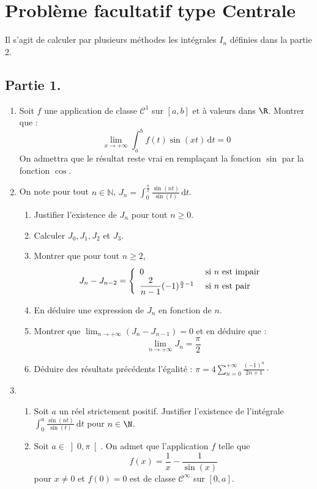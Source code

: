 \documentclass[a4paper,french,11pt,twoside]{VcCours}
\newcommand{\dt}{\text{d}t}
\begin{document}
\section*{Problème facultatif type Centrale}

Il s'agit de calculer par plusieurs méthodes les intégrales $I_n$ 
définies dans la partie 2.

\subsection*{Partie 1.}

 \begin{enumerate}
\item Soit $f$ une application de classe $\mathcal{C}^1$ sur $\left[ a, b \right]$ et {\`a} valeurs dans $\R$. Montrer que :
\[\lim_{x \rightarrow +\infty} \int_a^b f(t) \sin(xt) \, \dt = 0 \]
On admettra que le résultat reste vrai en remplaçant la fonction $\sin$ par la fonction $\cos$.
\item On note pour tout $n \in \mathbb{N}$, $J_n = \int_0^{\frac{\pi}{2}} \frac{\sin(nt)}{\sin(t)} \, \dt$.
\begin{enumerate}
\item Justifier l'existence de $J_n$ pour tout $n \geq 0$.
\item Calculer $J_0, J_1, J_2$ et $J_3$.
\item Montrer que pour tout $n \geq 2$, 
$$ J_n-J_{n-2} = \left\lbrace \begin{array}{ll} 
0 & \hbox{ si } n  \hbox{ est impair } \\
\dfrac{2}{n-1}(-1)^{\frac{n}{2}-1} & \hbox{ si } n \hbox{ est pair } \\
\end{array}\right.$$
\item En déduire une expression de $J_n$ en fonction de $n$.
\item Montrer que $\lim_{n \rightarrow +\infty} \left( J_n - J_{n-1} \right) = 0$ et en déduire que : 
$$\lim_{n \rightarrow +\infty} J_n = \frac{\pi}{2}$$
\item Déduire des résultats précédents l'égalité : $\pi = 4 \sum_{n=0}^{+\infty} \frac{(-1)^n}{2n+1}\cdot$
\end{enumerate}
\item
\begin{enumerate}
\item Soit $a$ un réel strictement positif. Justifier l'existence de l'intégrale $\int_0^a \frac{\sin(nt)}{\sin(t)} \ \dt$ pour $n \in \N$.
\item Soit $a \in \left] 0, \pi \right[$. On admet que l'application $f$ telle que 
$$f(x) = \frac{1}{x} - \frac{1}{\sin(x)}$$
pour $x \neq 0$ et $f(0) = 0$ est de classe $\mathcal{C}^\infty$ sur $\left[ 0, a \right]$.


\end{enumerate}
\end{enumerate}
\end{document}
